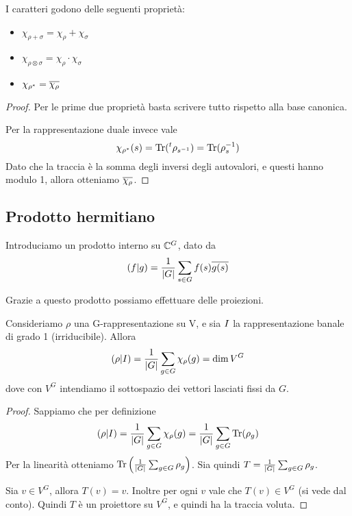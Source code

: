 \begin{mylemma}
I caratteri godono delle seguenti proprietà:
  \begin{itemize}
  \item $\chi_{\rho+\sigma}=\chi_\rho+\chi_\sigma$     
  \item $\chi_{\rho\otimes\sigma}=\chi_\rho\cdot\chi_\sigma$
  \item $\chi_{\rho^*} = \overline{\chi_\rho}$
  \end{itemize}
\end{mylemma}
\begin{proof}
	Per le prime due proprietà basta scrivere tutto rispetto alla base canonica.
	
  Per la rappresentazione duale invece vale 
  \[
		\chi_{\rho^*}(s)=\operatorname{Tr} (\prescript{t}{}{\rho}_{s^{-1}})=\operatorname{Tr} (\rho_s^{-1})
  \]
  Dato che la traccia è la somma degli inversi degli autovalori, e questi hanno modulo 1, allora otteniamo $\overline{\chi_\rho}$. 

\end{proof}

\subsection{Prodotto hermitiano}
Introduciamo un prodotto interno su $\mathbb C^{G}$, dato da 
\[
  \left(f | g\right) = \frac 1{\left|G\right|} \sum_{s\in G} f(s)\overline{g(s)}
\]

Grazie a questo prodotto possiamo effettuare delle proiezioni.

\begin{mylemma}
  Consideriamo $\rho$ una G-rappresentazione su V, e sia $I$ la rappresentazione banale di grado 1 (irriducibile). Allora 
  \[
  \left(\rho | I\right) = \frac 1{\left|G\right|}\sum_{g\in G} \chi_\rho(g) = \dim V^G
  \]    
  dove con $V^G$ intendiamo il sottospazio dei vettori lasciati fissi da $G$.
\end{mylemma}
\begin{proof}
  Sappiamo che per definizione
  \[
  \left(\rho | I\right) = \frac 1{\left|G\right|}\sum_{g\in G} \chi_\rho(g) = \frac 1{\left|G\right|}\sum_{g\in G} \operatorname{Tr}(\rho_g) 
  \]
  Per la linearità otteniamo $\operatorname{Tr}\left(\frac 1{\left|G\right|}\sum_{g\in G}\rho_g\right)$. Sia quindi $T=\frac 1{\left|G\right|}\sum_{g\in G}\rho_g$.
  
  Sia $v \in V^G$, allora $T(v)=v$. Inoltre per ogni $v$ vale che $T(v) \in V^G$ (si vede dal conto). Quindi $T$ è un proiettore su $V^G$, e quindi ha la traccia voluta.
  
\end{proof}

